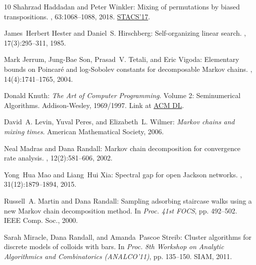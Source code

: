 \begin{thebibliography}{10}
{\sc Shahrzad Haddadan and Peter Winkler}: Mixing of permutations by biased
  transpositions.
, 63:1068--1088, 2018.
\newblock \prelim
  \href{https://doi.org/10.4230/LIPIcs.STACS.2017.41}{STACS'17}.
\newblock [\epfmtdoi{10.1007/s00224-018-9899-5}]

{\sc James~Herbert Hester and Daniel~S. Hirschberg}: Self-organizing linear
  search.
, 17(3):295--311, 1985.
\newblock [\epfmtdoi{10.1145/5505.5507}]

{\sc Mark Jerrum, Jung-Bae Son, Prasad~V. Tetali, and Eric Vigoda}: Elementary
  bounds on {P}oincar\'e and log-{S}obolev constants for decomposable {M}arkov
  chains.
, 14(4):1741--1765, 2004.
\newblock [\epfmtdoi{10.1214/105051604000000639}]

{\sc Donald Knuth}: {\em The Art of Computer Programming}.
\newblock Volume 2: Seminumerical Algorithms.
\newblock Addison-Wesley, 1969/1997.
\newblock Link at \href{https://dl.acm.org/doi/10.5555/270146}{ACM DL}.

{\sc David~A. Levin, Yuval Peres, and Elizabeth~L. Wilmer}: {\em {M}arkov
  chains and mixing times}.
\newblock American Mathematical Society, 2006.

{\sc Neal Madras and Dana Randall}: Markov chain decomposition for convergence
  rate analysis.
, 12(2):581--606, 2002.

{\sc Yong~Hua Mao and Liang~Hui Xia}: Spectral gap for open {J}ackson networks.
, 31(12):1879--1894, 2015.
\newblock [\epfmtdoi{10.1007/S10114-015-4138-3}]

{\sc Russell~A. Martin and Dana Randall}: Sampling adsorbing staircase walks
  using a new {M}arkov chain decomposition method.
\newblock In {\em Proc. 41st FOCS}, pp. 492--502. IEEE Comp. Soc., 2000.

{\sc Sarah Miracle, Dana Randall, and Amanda~Pascoe Streib}: Cluster algorithms
  for discrete models of colloids with bars.
\newblock In {\em Proc. 8th Workshop on Analytic Algorithmics and Combinatorics
  (ANALCO'11)}, pp. 135--150. SIAM, 2011.
\newblock [\epfmtdoi{10.1137/1.9781611973013.15}]


\end{thebibliography}
